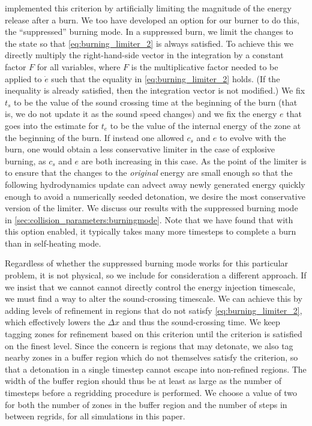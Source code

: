 \documentclass[12pt]{article}
\begin{document}
\citet{kushnir:2013} implemented this criterion by artificially 
limiting the magnitude of the energy release after a burn. We
too have developed an option for our burner to do this,
the ``suppressed'' burning mode. In a suppressed burn, we limit
the changes to the state so that \autoref{eq:burning_limiter_2}
is always satisfied. To achieve this we directly multiply the
right-hand-side vector in the integration by a constant factor $F$
for all variables, where $F$ is the multiplicative factor needed to
be applied to $\dot{e}$ such that the equality in \autoref{eq:burning_limiter_2}
holds. (If the inequality is already satisfied, then the integration
vector is not modified.) We fix $t_s$ to be the value of the sound
crossing time at the beginning of the burn (that is, we do not
update it as the sound speed changes) and we fix the energy $e$
that goes into the estimate for $t_e$ to be the value of the
internal energy of the zone at the beginning of the burn. If
instead one allowed $c_s$ and $e$ to evolve with the burn, one
would obtain a less conservative limiter in the case of explosive
burning, as $c_s$ and $e$ are both increasing in this case.
As the point of the limiter is to ensure that the changes to the
\textit{original} energy are small enough so that the following
hydrodynamics update can advect away newly generated energy
quickly enough to avoid a numerically seeded detonation,
we desire the most conservative version of the limiter. We discuss
our results with the suppressed burning mode in \autoref{sec:collision_parameters:burningmode}.
Note that we have found that with this option enabled, it typically takes
many more timesteps to complete a burn than in self-heating mode.

Regardless of whether the suppressed burning mode works for this
particular problem, it is not physical, so we include for
consideration a different approach. If we insist that we cannot
cannot directly control the energy injection timescale, we 
must find a way to alter the sound-crossing timescale. 
We can achieve this by adding levels of refinement in 
regions that do not satisfy \autoref{eq:burning_limiter_2},
which effectively lowers the $\Delta x$ and thus the
sound-crossing time. We keep tagging zones for refinement
based on this criterion until the criterion is satisfied
on the finest level. Since the concern is regions that 
may detonate, we also tag nearby zones in a buffer region
which do not themselves satisfy the criterion,
so that a detonation in a single timestep cannot 
escape into non-refined regions. The width of the buffer 
region should thus be at least as large as the number of 
timesteps before a regridding procedure is performed.
We choose a value of two for both the number of zones in the 
buffer region and the number of steps in between regrids,
for all simulations in this paper.
\end{document}
